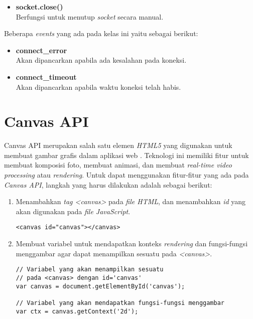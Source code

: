 \begin{enumerate}
\begin{itemize}
	\item \textbf{socket.close()} \\ Berfungsi untuk menutup \textit{socket} secara manual.
	\end{itemize}

	Beberapa \textit{events} yang ada pada kelas ini yaitu sebagai berikut:
	\begin{itemize}
		\item \textbf{connect\_error} \\ Akan dipancarkan apabila ada kesalahan pada koneksi.
		\item \textbf{connect\_timeout} \\ Akan dipancarkan apabila waktu koneksi telah habis.
	\end{itemize}
\end{enumerate} 


 

\section{Canvas API}
\label{sec:Canvas API}
 
Canvas API merupakan salah satu elemen \textit{HTML5} yang digunakan untuk membuat gambar grafis dalam aplikasi web \cite{canvas}. Teknologi ini memiliki fitur untuk membuat komposisi foto, membuat animasi, dan membuat \textit{real-time video processing} atau \textit{rendering}. Untuk dapat menggunakan fitur-fitur yang ada pada \textit{Canvas API}, langkah yang harus dilakukan adalah sebagai berikut:
\begin{enumerate}
	\item Menambahkan \textit{tag <canvas>} pada \textit{file HTML}, dan menambahkan \textit{id} yang akan digunakan pada \textit{file JavaScript}.
\begin{lstlisting}
<canvas id="canvas"></canvas>
\end{lstlisting}
	
	\item Membuat variabel untuk mendapatkan konteks \textit{rendering} dan fungsi-fungsi menggambar agar dapat menampilkan sesuatu pada \textit{<canvas>}.
\begin{lstlisting}
// Variabel yang akan menampilkan sesuatu 
// pada <canvas> dengan id='canvas'
var canvas = document.getElementById('canvas'); 
	
// Variabel yang akan mendapatkan fungsi-fungsi menggambar 
var ctx = canvas.getContext('2d');
\end{lstlisting}
\end{enumerate}

